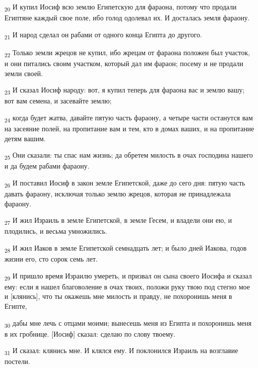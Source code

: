 \begin{tcolorbox}
\textsubscript{20} И купил Иосиф всю землю Египетскую для фараона, потому что продали Египтяне каждый свое поле, ибо голод одолевал их. И досталась земля фараону.
\end{tcolorbox}
\begin{tcolorbox}
\textsubscript{21} И народ сделал он рабами от одного конца Египта до другого.
\end{tcolorbox}
\begin{tcolorbox}
\textsubscript{22} Только земли жрецов не купил, ибо жрецам от фараона положен был участок, и они питались своим участком, который дал им фараон; посему и не продали земли своей.
\end{tcolorbox}
\begin{tcolorbox}
\textsubscript{23} И сказал Иосиф народу: вот, я купил теперь для фараона вас и землю вашу; вот вам семена, и засевайте землю;
\end{tcolorbox}
\begin{tcolorbox}
\textsubscript{24} когда будет жатва, давайте пятую часть фараону, а четыре части останутся вам на засеяние полей, на пропитание вам и тем, кто в домах ваших, и на пропитание детям вашим.
\end{tcolorbox}
\begin{tcolorbox}
\textsubscript{25} Они сказали: ты спас нам жизнь; да обретем милость в очах господина нашего и да будем рабами фараону.
\end{tcolorbox}
\begin{tcolorbox}
\textsubscript{26} И поставил Иосиф в закон земле Египетской, даже до сего дня: пятую часть давать фараону, исключая только землю жрецов, которая не принадлежала фараону.
\end{tcolorbox}
\begin{tcolorbox}
\textsubscript{27} И жил Израиль в земле Египетской, в земле Гесем, и владели они ею, и плодились, и весьма умножились.
\end{tcolorbox}
\begin{tcolorbox}
\textsubscript{28} И жил Иаков в земле Египетской семнадцать лет; и было дней Иакова, годов жизни его, сто сорок семь лет.
\end{tcolorbox}
\begin{tcolorbox}
\textsubscript{29} И пришло время Израилю умереть, и призвал он сына своего Иосифа и сказал ему: если я нашел благоволение в очах твоих, положи руку твою под стегно мое и [клянись], что ты окажешь мне милость и правду, не похоронишь меня в Египте,
\end{tcolorbox}
\begin{tcolorbox}
\textsubscript{30} дабы мне лечь с отцами моими; вынесешь меня из Египта и похоронишь меня в их гробнице. [Иосиф] сказал: сделаю по слову твоему.
\end{tcolorbox}
\begin{tcolorbox}
\textsubscript{31} И сказал: клянись мне. И клялся ему. И поклонился Израиль на возглавие постели.
\end{tcolorbox}
